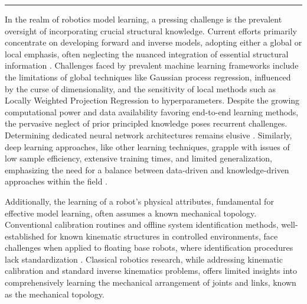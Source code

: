 \documentclass[12pt, a4paper]{article}
\begin{document}
\hrule
\newpage
In the realm of robotics model learning, a pressing challenge is the prevalent oversight of incorporating crucial structural knowledge. Current efforts primarily concentrate on developing forward and inverse models, adopting either a global or local emphasis, often neglecting the nuanced integration of essential structural information \cite{NguyenTuong2011Modellearningrobot}. Challenges faced by prevalent machine learning frameworks include the limitations of global techniques like Gaussian process regression, influenced by the curse of dimensionality, and the sensitivity of local methods such as Locally Weighted Projection Regression to hyperparameters. Despite the growing computational power and data availability favoring end-to-end learning methods, the pervasive neglect of prior principled knowledge poses recurrent challenges. Determining dedicated neural network architectures remains elusive \cite{Baker2017Designingneuralnetwork,Elsken2019Neuralarchitecturesearch}. Similarly, deep learning approaches, like other learning techniques, grapple with issues of low sample efficiency, extensive training times, and limited generalization, emphasizing the need for a balance between data-driven and knowledge-driven approaches within the field \cite{Pierson2017Deeplearningrobotics,Suenderhauf2018limitspotentialsdeep}.

Additionally, the learning of a robot's physical attributes, fundamental for effective model learning, often assumes a known mechanical topology. Conventional calibration routines and offline system identification methods, well-established for known kinematic structures in controlled environments, face challenges when applied to floating base robots, where identification procedures lack standardization \cite{Hollerbach1996CalibrationIndexTaxonomy,Swevers2007Dynamicmodelidentification,LeboutetInertialParameterIdentification,Ayusawa2014Identifiabilityidentificationinertial,Lee2022OptimizedSystemIdentification}. Classical robotics research, while addressing kinematic calibration and standard inverse kinematics problems, offers limited insights into comprehensively learning the mechanical arrangement of joints and links, known as the mechanical topology.
\end{document}
